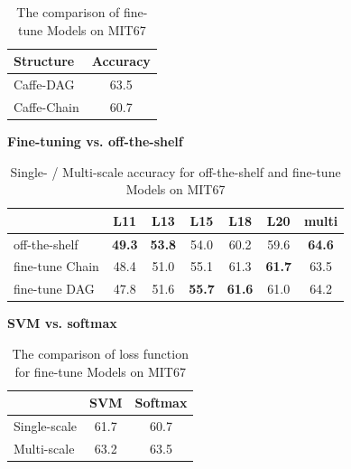 \documentclass[10pt,twocolumn,letterpaper]{article}
\begin{document}
\begin{table}[htbp]
\begin{center}
\begin{tabular}{|l|c|}
\hline
Structure & Accuracy \\
\hline
Caffe-DAG & 63.5   \\
Caffe-Chain & 60.7   \\

\hline
\end{tabular}
\end{center}
\caption{The comparison of fine-tune Models on MIT67}
\label{table:ft_models}
\end{table}




{\bf Fine-tuning vs. off-the-shelf} 


\begin{table}[htbp]
\begin{center}
\begin{tabular}{|l|c|c|c|c|c|c|}
\hline
& L11 & L13 & L15 & L18 & L20 & multi \\
\hline
off-the-shelf & \textbf{49.3} & \textbf{53.8} & 54.0 & 60.2 & 59.6 & \textbf{64.6} \\
fine-tune Chain   & 48.4 & 51.0 & 55.1 & 61.3 & \textbf{61.7} & 63.5 \\
fine-tune DAG     & 47.8 & 51.6 & \textbf{55.7} & \textbf{61.6} & 61.0 & 64.2	\\
\hline
\end{tabular}
\end{center}
\caption{Single- / Multi-scale accuracy for off-the-shelf and fine-tune Models on MIT67}
\label{table:ft_ots}
\end{table}


{\bf SVM vs. softmax}

\begin{table}[htbp]
\begin{center}
\begin{tabular}{|l|c|c|}
\hline
 & SVM & Softmax \\	
\hline
Single-scale &	61.7 & 60.7 \\
Multi-scale & 63.2 & 63.5   \\

\hline
\end{tabular}
\end{center}
\caption{The comparison of loss function for fine-tune Models on MIT67}
\label{table:loss}
\end{table}
\end{document}
